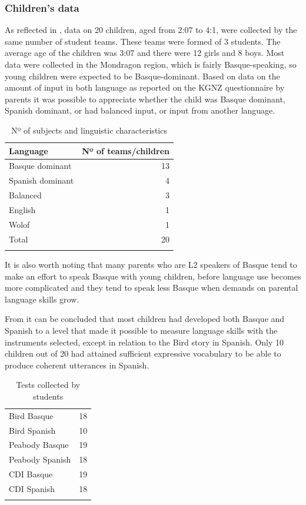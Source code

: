 \documentclass[output=paper]{../langscibook}
\begin{document}
\subsubsection{Children’s data}

As reflected in , data on 20 children, aged from 2:07 to 4:1, were collected by the same number of student teams. These teams were formed of 3 students. The average age of the children was 3:07 and there were 12 girls and 8 boys. Most data were collected in the Mondragon region, which is fairly Basque-speaking, so young children were expected to be Basque-dominant. Based on data on the amount of input in both language as reported on the KGNZ questionnaire by parents it was possible to appreciate whether the child was Basque dominant, Spanish dominant, or had balanced input, or input from another language.

\begin{table}
\begin{tabular}{lr}
\lsptoprule
Language & Nº of teams\slash children\\\midrule
Basque dominant & 13\\ 
Spanish dominant & 4\\
Balanced & 3\\
English & 1\\
Wolof & 1\\\midrule
Total & 20\\\lspbottomrule
\end{tabular}
\caption{Nº of subjects and linguistic characteristics\label{tab:6:1}}
\end{table}

It is also worth noting that many parents who are L2 speakers of Basque tend to make an effort to speak Basque with young children, before language use becomes more complicated and they tend to speak less Basque when demands on parental language skills grow.

From  it can be concluded that most children had developed both Basque and Spanish to a level that made it possible to measure language skills with the instruments selected, except in relation to the Bird story in Spanish. Only 10 children out of 20 had attained sufficient expressive vocabulary to be able to produce coherent utterances in Spanish.

\begin{table}
\begin{tabular}{lr}
\lsptoprule
Bird Basque & 18\\
Bird Spanish & 10\\
Peabody Basque & 19\\
Peabody Spanish & 18\\
CDI Basque & 19\\
CDI Spanish & 18\\\lspbottomrule
\end{tabular}
\caption{Tests collected by students\label{tab:6:2}}
\end{table}
\end{document}
